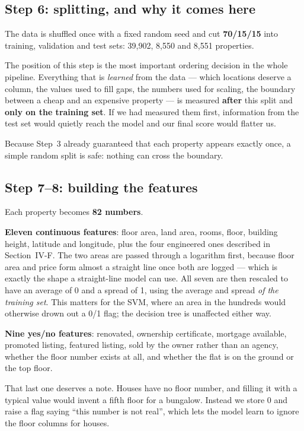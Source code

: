 \documentclass[10pt,twocolumn,a4paper]{article}
\begin{document}
\subsection{Step 6: splitting, and why it comes here}

The data is shuffled once with a fixed random seed and cut
\textbf{70/15/15} into training, validation and test sets: 39{,}902,
8{,}550 and 8{,}551 properties.

The position of this step is the most important ordering decision in the
whole pipeline. Everything that is \emph{learned} from the data ---
which locations deserve a column, the values used to fill gaps, the
numbers used for scaling, the boundary between a cheap and an expensive
property --- is measured \textbf{after} this split and \textbf{only on
the training set}. If we had measured them first, information from the
test set would quietly reach the model and our final score would flatter
us.

Because Step~3 already guaranteed that each property appears exactly
once, a simple random split is safe: nothing can cross the boundary.

\subsection{Step 7--8: building the features}

Each property becomes \textbf{82 numbers}.

\textbf{Eleven continuous features}: floor area, land area, rooms, floor,
building height, latitude and longitude, plus the four engineered ones
described in Section~IV-F. The two areas are passed
through a logarithm first, because floor area and price form almost a
straight line once both are logged --- which is exactly the shape a
straight-line model can use. All seven are then rescaled to have an
average of 0 and a spread of 1, using the average and spread
\emph{of the training set}. This matters for the SVM, where an area in
the hundreds would otherwise drown out a 0/1 flag; the decision tree is
unaffected either way.

\textbf{Nine yes/no features}: renovated, ownership certificate,
mortgage available, promoted listing, featured listing, sold by the owner
rather than an agency, whether the floor number exists at all, and whether
the flat is on the ground or the top floor.

That last one deserves a note. Houses have no floor number, and filling
it with a typical value would invent a fifth floor for a bungalow.
Instead we store 0 and raise a flag saying ``this number is not real'',
which lets the model learn to ignore the floor columns for houses.
\end{document}
